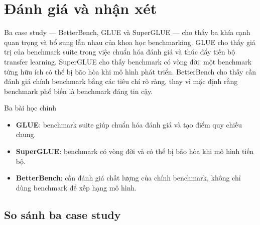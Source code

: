 
\section{Đánh giá và nhận xét}
\label{sec:discussion}

Ba case study --- BetterBench, GLUE và SuperGLUE --- cho thấy ba khía cạnh quan trọng và bổ sung lẫn nhau của khoa học benchmarking. GLUE cho thấy giá trị của benchmark suite trong việc chuẩn hóa đánh giá và thúc đẩy tiến bộ transfer learning. SuperGLUE cho thấy benchmark có vòng đời: một benchmark từng hữu ích có thể bị bão hòa khi mô hình phát triển. BetterBench cho thấy cần đánh giá chính benchmark bằng các tiêu chí rõ ràng, thay vì mặc định rằng benchmark phổ biến là benchmark đáng tin cậy.

\begin{summarybox}{Ba bài học chính}
\begin{itemize}
    \item \textbf{GLUE}: benchmark suite giúp chuẩn hóa đánh giá và tạo điểm quy chiếu chung.
    \item \textbf{SuperGLUE}: benchmark có vòng đời và có thể bị bão hòa khi mô hình tiến bộ.
    \item \textbf{BetterBench}: cần đánh giá chất lượng của chính benchmark, không chỉ dùng benchmark để xếp hạng mô hình.
\end{itemize}
\end{summarybox}

\subsection{So sánh ba case study}

